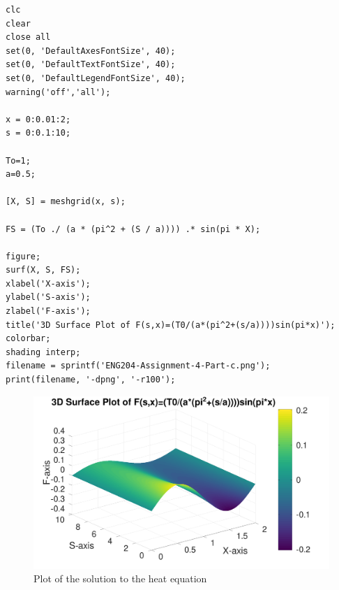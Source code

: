 \documentclass[11pt]{article}
\begin{document}
\begin{verbatim}
clc
clear
close all
set(0, 'DefaultAxesFontSize', 40);
set(0, 'DefaultTextFontSize', 40);
set(0, 'DefaultLegendFontSize', 40);
warning('off','all');

x = 0:0.01:2;
s = 0:0.1:10;

To=1;
a=0.5;

[X, S] = meshgrid(x, s);

FS = (To ./ (a * (pi^2 + (S / a)))) .* sin(pi * X);

figure;
surf(X, S, FS);
xlabel('X-axis');
ylabel('S-axis');
zlabel('F-axis');
title('3D Surface Plot of F(s,x)=(T0/(a*(pi^2+(s/a))))sin(pi*x)');
colorbar;
shading interp;
filename = sprintf('ENG204-Assignment-4-Part-c.png');
print(filename, '-dpng', '-r100');
\end{verbatim}

\begin{FIGURE}
\begin{figure}[H]
\centering
\includegraphics[width=.9\linewidth]{ENG204-Assignment-4-Part-c.png}
\caption{Plot of the solution to the heat equation}
\end{figure}
\end{FIGURE}
\end{document}
